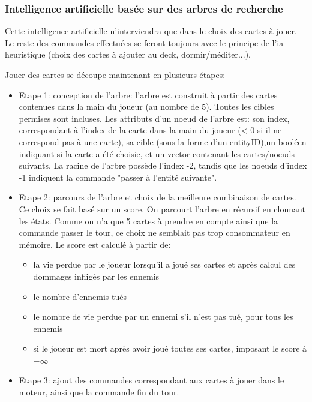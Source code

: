         \subsubsection{Intelligence artificielle basée sur des arbres de recherche}
        Cette intelligence artificielle n'interviendra que dans le choix des cartes à jouer. Le reste des commandes effectuées se feront toujours avec le principe de l'ia heuristique (choix des cartes à ajouter au deck, dormir/méditer...).
        \par Jouer des cartes se découpe maintenant en plusieurs étapes:
        \begin{itemize}
            \item Etape 1: conception de l'arbre: l'arbre est construit à partir des cartes contenues dans la main du joueur (au nombre de 5). Toutes les cibles permises sont incluses. Les attributs d'un noeud de l'arbre est: son index, correspondant à l'index de la carte dans la main du joueur (< 0 si il ne correspond pas à une carte), sa cible (sous la forme d'un entityID),un booléen indiquant si la carte a été choisie, et un vector contenant les cartes/noeuds suivants. La racine de l'arbre possède l'index -2, tandis que les noeuds d'index -1 indiquent la commande "passer à l'entité suivante".
            \item Etape 2: parcours de l'arbre et choix de la meilleure combinaison de cartes. Ce choix se fait basé sur un score. On parcourt l'arbre en récursif en clonnant les états. Comme on n'a que 5 cartes à prendre en compte ainsi que la commande passer le tour, ce choix ne semblait pas trop consommateur en mémoire. Le score est calculé à partir de: 
            \begin{itemize}
                \item la vie perdue par le joueur lorsqu'il a joué ses cartes et après calcul des dommages infligés par les ennemis
                \item le nombre d'ennemis tués
                \item le nombre de vie perdue par un ennemi s'il n'est pas tué, pour tous les ennemis
                \item si le joueur est mort après avoir joué toutes ses cartes, imposant le score à $-\infty$
            \end{itemize}
            \item Etape 3: ajout des commandes correspondant aux cartes à jouer dans le moteur, ainsi que la commande fin du tour.
        \end{itemize}
        
